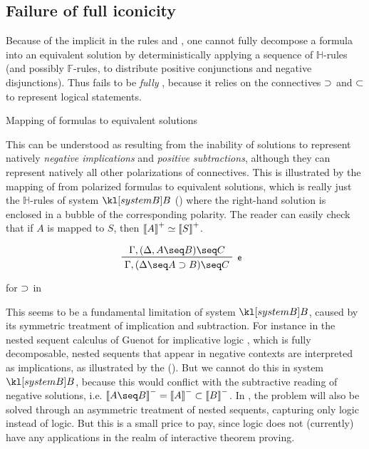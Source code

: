 \subsection{Failure of full iconicity}

Because of the implicit  in the rules \rsf{{\limp}{-}} and
\rsf{{\lsub}{+}}, one cannot fully decompose a formula into an equivalent
solution by deterministically applying a sequence of $\mathbb{H}$-rules (and
possibly $\mathbb{F}$-rules, to distribute positive conjunctions and negative
disjunctions). Thus  fails to be \emph{fully }, because it
relies on the \emph{} connectives $\supset$ and $\subset$ to represent
logical statements.

\begin{marginfigure}
  
  \caption{Mapping of formulas to equivalent solutions}
\end{marginfigure}

This can be understood as resulting from the inability of solutions to represent
natively \emph{negative implications} and \emph{positive subtractions}, although
they can represent natively all other polarizations of connectives. This is
illustrated by the mapping of  from polarized formulas to
equivalent solutions, which is really just the $\mathbb{H}$-rules of system
$\sysB$ () where the right-hand solution is enclosed in a
bubble of the corresponding polarity. The reader can easily check that if $A$ is
mapped to $S$, then $\left\llbracket A \right\rrbracket^+ \simeq \left\llbracket S \right\rrbracket^+$.

\begin{marginfigure}
  $$
  \R[\rsf{e}]
    {\Gamma, (\Delta, A \seq B) \seq C}
    {\Gamma, (\Delta \seq A \limp B) \seq C}
  $$
  \caption{ for $\supset$ in }
\end{marginfigure}

This seems to be a fundamental limitation of system $\sysB$, caused by its
symmetric treatment of implication and subtraction. For instance in the nested
sequent calculus  of Guenot for implicative logic \cite[Chapter
3]{guenot_nested_2013}, which is fully decomposable, nested sequents that appear
in negative contexts are interpreted as implications, as illustrated by the
  (). But we cannot do this
in system $\sysB$, because this would conflict with the subtractive reading of
negative solutions, i.e. $\nsint{A \seq B} = \nsint{A} \lsub \nsint{B}$. In
, the problem will also be solved through an asymmetric treatment
of nested sequents, capturing only  logic instead of
 logic. But this is a small price to pay, since
 logic does not (currently) have any applications in the
realm of interactive theorem proving.
